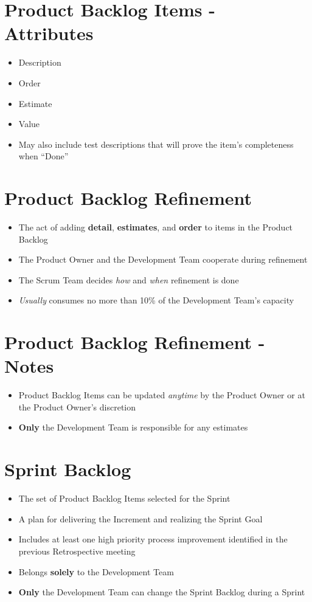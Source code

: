 \documentclass[a4paper,11pt,twocolumn]{article}
\begin{document}
\section*{Product Backlog Items - Attributes}
\begin{itemize}
	\item Description
    \item Order
    \item Estimate
    \item Value
    \item May also include test descriptions that will prove the item's completeness when ``Done''
\end{itemize}

\section*{Product Backlog Refinement}
\begin{itemize}
	\item The act of adding \textbf{detail}, \textbf{estimates}, and \textbf{order} to items in the Product Backlog
	\item The Product Owner and the Development Team cooperate during refinement
	\item The Scrum Team decides \textit{how} and \textit{when} refinement is done
	\item \textit{Usually} consumes no more than 10\% of the Development Team's capacity
\end{itemize}

\section*{Product Backlog Refinement - Notes}
\begin{itemize}
	\item Product Backlog Items can be updated \textit{anytime} by the Product Owner or at the Product Owner's discretion
	\item \textbf{Only} the Development Team is responsible for any estimates
\end{itemize}

\section*{Sprint Backlog}
\begin{itemize}
	\item The set of Product Backlog Items selected for the Sprint
	\item A plan for delivering the Increment and realizing the Sprint Goal
	\item Includes at least one high priority process improvement identified in the previous Retrospective meeting
	\item Belongs \textbf{solely} to the Development Team
	\item \textbf{Only} the Development Team can change the Sprint Backlog during a Sprint
\end{itemize}
\end{document}
